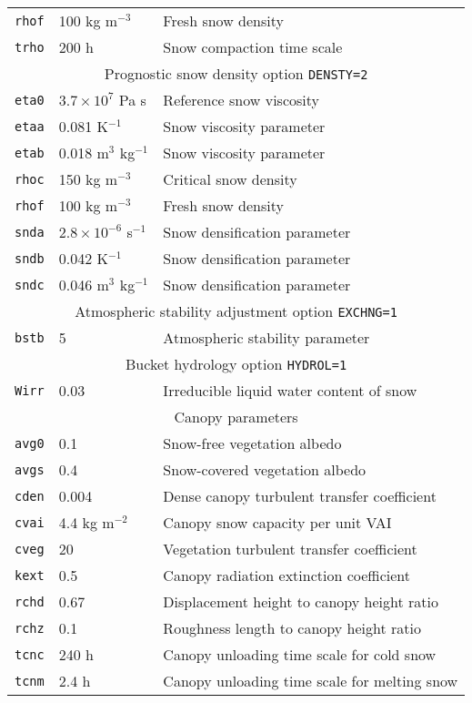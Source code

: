 \documentclass{article}
\begin{document}
\begin{tabular}{|l|l|l|}
{\tt rhof} & 100 kg m$^{-3}$ & Fresh snow density               \\
{\tt trho} & 200 h           & Snow compaction time scale       \\
\hline
\hline
\multicolumn{3}{|c|}{Prognostic snow density option {\tt DENSTY=2}} \\
\hline 
{\tt eta0} & $3.7 \times 10^7$ Pa s        & Reference snow viscosity     \\
{\tt etaa} & 0.081 K$^{-1}$                & Snow viscosity parameter     \\
{\tt etab} & 0.018 m$^3$ kg$^{-1}$         & Snow viscosity parameter     \\
{\tt rhoc} & 150 kg m$^{-3}$               & Critical snow density        \\
{\tt rhof} & 100 kg m$^{-3}$               & Fresh snow density           \\
{\tt snda} & $2.8 \times 10^{-6}$ s$^{-1}$ & Snow densification parameter \\
{\tt sndb} & 0.042 K$^{-1}$                & Snow densification parameter \\
{\tt sndc} & 0.046 m$^3$ kg$^{-1}$         & Snow densification parameter \\
\hline 
\hline
\multicolumn{3}{|c|}{Atmospheric stability adjustment option {\tt EXCHNG=1}} \\
\hline 
{\tt bstb} & 5 & Atmospheric stability parameter                               \\
\hline
\hline 
\multicolumn{3}{|c|}{Bucket hydrology option {\tt HYDROL=1}} \\
\hline
{\tt Wirr} & 0.03 & Irreducible liquid water content of snow   \\
\hline
\hline
\multicolumn{3}{|c|}{Canopy parameters} \\
\hline
{\tt avg0} & 0.1             & Snow-free vegetation albedo                  \\
{\tt avgs} & 0.4             & Snow-covered vegetation albedo               \\ 
{\tt cden} & 0.004           & Dense canopy turbulent transfer coefficient  \\
{\tt cvai} & 4.4 kg m$^{-2}$ & Canopy snow capacity per unit VAI            \\
{\tt cveg} & 20              & Vegetation turbulent transfer coefficient    \\
{\tt kext} & 0.5             & Canopy radiation extinction coefficient      \\
{\tt rchd} & 0.67            & Displacement height to canopy height ratio   \\
{\tt rchz} & 0.1             & Roughness length to canopy height ratio      \\
{\tt tcnc} & 240 h           & Canopy unloading time scale for cold snow    \\
{\tt tcnm} & 2.4 h           & Canopy unloading time scale for melting snow \\
\hline 
\end{tabular}
\end{document}
